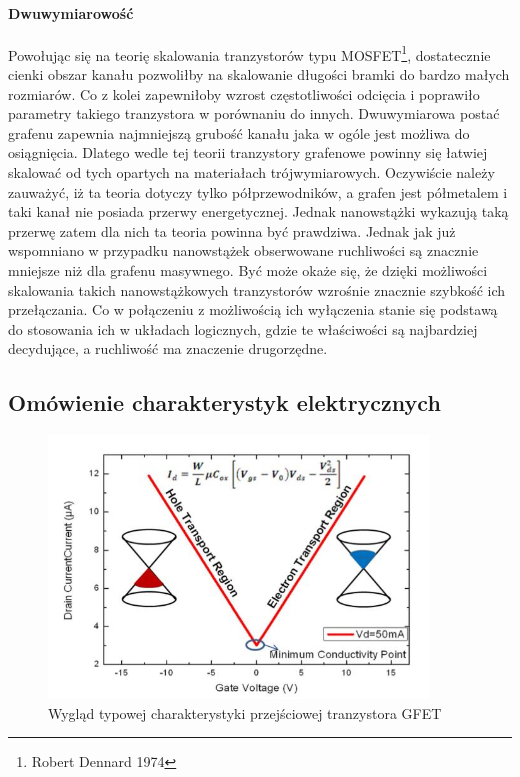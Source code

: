 \paragraph{Dwuwymiarowość}
	Powołując się na teorię skalowania tranzystorów typu MOSFET\footnote{Robert Dennard 1974}, 
	dostatecznie cienki obszar kanału pozwoliłby 
	na skalowanie długości bramki do bardzo małych rozmiarów. Co z kolei zapewniłoby wzrost częstotliwości odcięcia
	i poprawiło parametry takiego tranzystora w porównaniu do innych. Dwuwymiarowa postać grafenu zapewnia najmniejszą
	grubość kanału jaka w ogóle jest możliwa do osiągnięcia. Dlatego wedle tej teorii tranzystory grafenowe powinny się
	łatwiej skalować od tych opartych na materiałach trójwymiarowych. Oczywiście należy zauważyć, iż ta teoria dotyczy 
	tylko półprzewodników, a grafen jest półmetalem i taki kanał nie posiada przerwy energetycznej. Jednak
	 nanowstążki wykazują taką przerwę zatem dla nich ta teoria powinna być prawdziwa. Jednak jak już wspomniano
	w przypadku nanowstążek obserwowane ruchliwości są znacznie mniejsze niż dla grafenu masywnego. Być może okaże się,
	że dzięki możliwości skalowania takich nanowstążkowych tranzystorów wzrośnie znacznie szybkość ich przełączania. 
	Co w połączeniu z możliwością ich wyłączenia stanie się podstawą do stosowania ich w układach logicznych, gdzie
	te właściwości są najbardziej decydujące, a ruchliwość ma znaczenie drugorzędne. 

		\subsection{Omówienie charakterystyk elektrycznych}

	\begin{figure}[ht]
	\centering
	\includegraphics[width=0.90\textwidth]{./Rozdzial_3/obrazki/charakterystykaPrzej}
	\caption{Wygląd typowej charakterystyki przejściowej tranzystora GFET}
	\label{fig:GFET_trans} 
	\end{figure}

